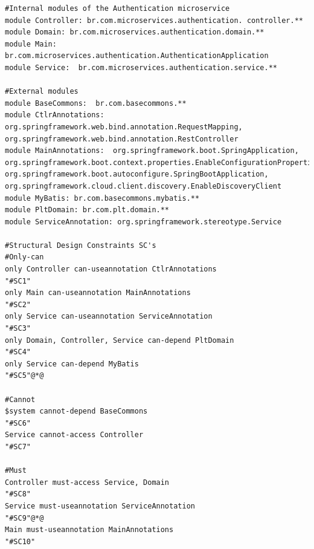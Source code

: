 \documentclass[12pt]{article}
\begin{document}
\begin{lstlisting}[style=colorido, caption={\textcolor{blue}{Authentication microservice's architectural project specification.}},label={list:especArquiteturalAuthentication}
]
#Internal modules of the Authentication microservice
module Controller: br.com.microservices.authentication. controller.**
module Domain: br.com.microservices.authentication.domain.**
module Main: br.com.microservices.authentication.AuthenticationApplication
module Service:  br.com.microservices.authentication.service.**

#External modules
module BaseCommons:  br.com.basecommons.**
module CtlrAnnotations: org.springframework.web.bind.annotation.RequestMapping, org.springframework.web.bind.annotation.RestController
module MainAnnotations:  org.springframework.boot.SpringApplication, org.springframework.boot.context.properties.EnableConfigurationProperties, org.springframework.boot.autoconfigure.SpringBootApplication, org.springframework.cloud.client.discovery.EnableDiscoveryClient
module MyBatis: br.com.basecommons.mybatis.**
module PltDomain: br.com.plt.domain.**
module ServiceAnnotation: org.springframework.stereotype.Service

#Structural Design Constraints SC's
#Only-can
only Controller can-useannotation CtlrAnnotations																																		"#SC1"
only Main can-useannotation MainAnnotations																																								"#SC2"
only Service can-useannotation ServiceAnnotation																																			"#SC3"
only Domain, Controller, Service can-depend PltDomain																														"#SC4"
only Service can-depend MyBatis																																																				"#SC5"@*@

#Cannot
$system cannot-depend BaseCommons																																																		"#SC6"
Service cannot-access Controller																																																			"#SC7"

#Must
Controller must-access Service, Domain																																													"#SC8"
Service must-useannotation ServiceAnnotation																																							"#SC9"@*@
Main must-useannotation MainAnnotations																																												"#SC10"
\end{lstlisting}
\end{document}
